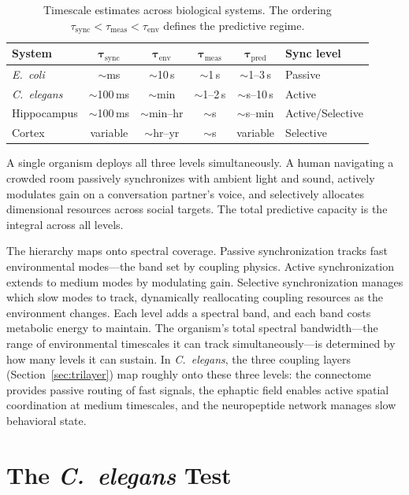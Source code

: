 \documentclass[12pt]{article}
\newcommand{\tsync}{\tau_{\mathrm{sync}}}
\newcommand{\tenv}{\tau_{\mathrm{env}}}
\newcommand{\tmeas}{\tau_{\mathrm{meas}}}
\newcommand{\tpred}{\tau_{\mathrm{pred}}}
\begin{document}
\begin{table}[H]
\centering
\caption{Timescale estimates across biological systems. The ordering $\tsync < \tmeas < \tenv$ defines the predictive regime.}
\label{tab:synthesis}
\begin{tabular}{l c c c c l}
\toprule
\textbf{System} & $\boldsymbol{\tsync}$ & $\boldsymbol{\tenv}$ & $\boldsymbol{\tmeas}$ & $\boldsymbol{\tpred}$ & \textbf{Sync level} \\
\midrule
\textit{E.\ coli} & $\sim$ms & $\sim$10\,s & $\sim$1\,s & $\sim$1--3\,s & Passive \\
\textit{C.\ elegans} & $\sim$100\,ms & $\sim$min & $\sim$1--2\,s & $\sim$s--10\,s & Active \\
Hippocampus & $\sim$100\,ms & $\sim$min--hr & $\sim$s & $\sim$s--min & Active/Selective \\
Cortex & variable & $\sim$hr--yr & $\sim$s & variable & Selective \\
\bottomrule
\end{tabular}
\end{table}

A single organism deploys all three levels simultaneously. A human navigating a crowded room passively synchronizes with ambient light and sound, actively modulates gain on a conversation partner's voice, and selectively allocates dimensional resources across social targets. The total predictive capacity is the integral across all levels.

The hierarchy maps onto spectral coverage. Passive synchronization tracks fast environmental modes---the band set by coupling physics. Active synchronization extends to medium modes by modulating gain. Selective synchronization manages which slow modes to track, dynamically reallocating coupling resources as the environment changes. Each level adds a spectral band, and each band costs metabolic energy to maintain. The organism's total spectral bandwidth---the range of environmental timescales it can track simultaneously---is determined by how many levels it can sustain. In \textit{C.~elegans}, the three coupling layers (Section~\ref{sec:trilayer}) map roughly onto these three levels: the connectome provides passive routing of fast signals, the ephaptic field enables active spatial coordination at medium timescales, and the neuropeptide network manages slow behavioral state.


\section{The \textit{C.\ elegans} Test}
\label{sec:celegans}
\end{document}
